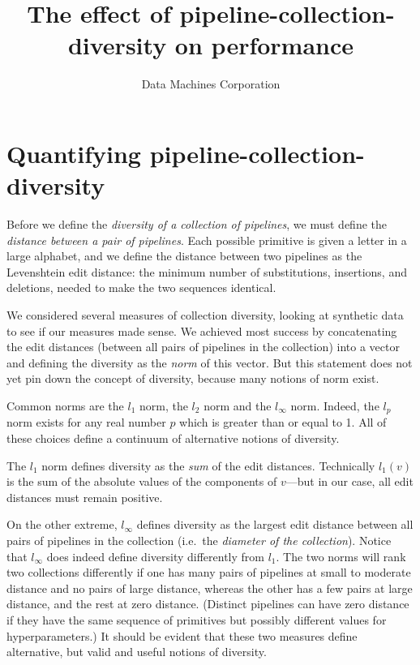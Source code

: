 \documentclass{article}
\title{The effect of pipeline-collection-diversity on performance}
\author{Data Machines Corporation}
\begin{document}
\maketitle


\section{Quantifying pipeline-collection-diversity}
  Before we define the \emph{diversity of a collection of pipelines},
  we must define the \emph{distance between a pair of pipelines}.  Each
  possible primitive is given a letter in a large alphabet, and we
  define the distance between two pipelines as the Levenshtein edit
  distance: the minimum number of substitutions, insertions, and
  deletions, needed to make the two sequences identical.

  We considered several measures of collection diversity, looking at
  synthetic data to see if our measures made sense.  We achieved most
  success by concatenating the edit distances (between all pairs of
  pipelines in the collection) into a vector and defining the
  diversity as the \emph{norm} of this vector.  But this statement
  does not yet pin down the concept of diversity, because many notions
  of norm exist.

  Common norms are the $l_1$ norm, the $l_2$ norm and the $l_\infty$
  norm.  Indeed, the $l_p$ norm exists for any real number $p$ which
  is greater than or equal to 1.  All of these choices define a
  continuum of alternative notions of diversity.

  The $l_1$ norm defines diversity as the \emph{sum} of the edit
  distances.  Technically $l_1(v)$ is the sum of the absolute values
  of the components of $v$---but in our case, all edit distances must
  remain positive.

  On the other extreme, $l_\infty$ defines diversity as the largest
  edit distance between all pairs of pipelines in the collection (i.e.\ the
  \emph{diameter of the collection}).  Notice that $l_\infty$ does
  indeed define diversity differently from $l_1$.  The two norms will
  rank two collections differently if one has many pairs of pipelines
  at small to moderate distance and no pairs of large distance,
  whereas the other has a few pairs at large distance, and the rest at
  zero distance.  (Distinct pipelines can have zero distance if they
  have the same sequence of primitives but possibly different values
  for hyperparameters.)  It should be evident that these two measures
  define alternative, but valid and useful notions of diversity.
\end{document}
